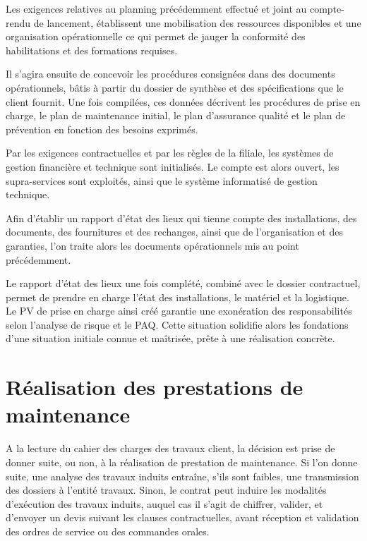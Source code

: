 Les exigences relatives au planning précédemment effectué et joint au compte-rendu de lancement, établissent une mobilisation des ressources disponibles et une organisation opérationnelle ce qui permet de  jauger la conformité des habilitations et  des formations requises.

Il s’agira ensuite de concevoir les procédures consignées dans des documents opérationnels, bâtis à partir du dossier de synthèse et des spécifications que le client fournit. Une fois compilées, ces données décrivent les procédures de prise en charge, le plan de maintenance initial, le plan d’assurance qualité et le plan de prévention en fonction des besoins exprimés.

Par les exigences contractuelles et par les règles de la filiale, les systèmes de gestion financière et technique sont initialisés. Le compte est alors ouvert, les supra-services sont exploités, ainsi que le système informatisé de gestion technique.

Afin d’établir un rapport d’état des lieux qui tienne compte des installations, des documents, des fournitures et des rechanges, ainsi que de l’organisation et des garanties, l’on traite alors les documents opérationnels mis au point précédemment.

Le rapport d’état des lieux une fois complété, combiné avec le dossier contractuel, permet de prendre en charge l’état des installations, le matériel et la logistique. Le PV de prise en charge ainsi créé garantie une exonération des responsabilités selon l’analyse de risque et le PAQ. Cette situation solidifie alors les fondations d’une situation initiale connue et maîtrisée, prête à une réalisation concrète.

%

\section{Réalisation des prestations de maintenance}

A la lecture du cahier des charges des travaux client, la décision est prise de donner suite, ou non, à la réalisation de prestation de maintenance. Si l’on donne suite, une analyse des travaux induits entraîne, s’ils sont faibles, une transmission des dossiers à l’entité travaux. Sinon, le contrat peut induire les modalités d’exécution des travaux induits, auquel cas il s’agit de chiffrer, valider, et d’envoyer un devis suivant les clauses contractuelles, avant réception et validation des ordres de service ou des commandes orales.

